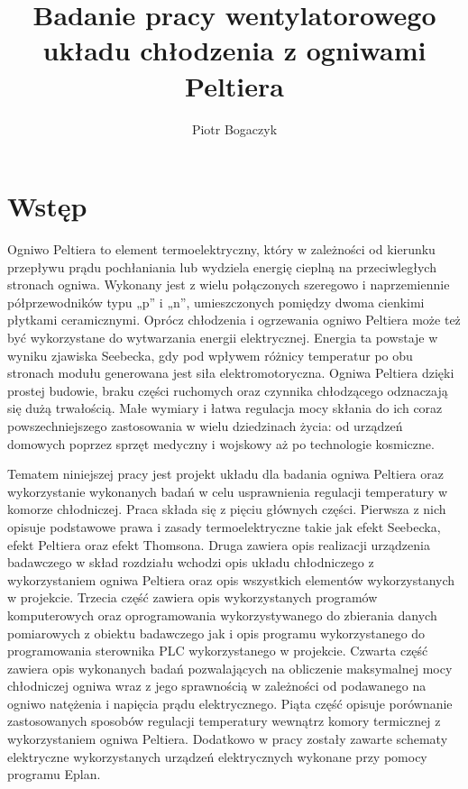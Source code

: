 \documentclass[oneside]{mgr}
\title{Badanie pracy wentylatorowego układu chłodzenia z ogniwami Peltiera}
\author{Piotr Bogaczyk}
\begin{document}
\maketitle
\tableofcontents

\chapter{Wstęp}

Ogniwo Peltiera to element termoelektryczny, który w zależności od kierunku przepływu prądu pochłaniania lub wydziela energię cieplną na przeciwległych stronach ogniwa. Wykonany jest z wielu połączonych szeregowo i naprzemiennie półprzewodników typu „p” i „n”, umieszczonych pomiędzy dwoma cienkimi płytkami ceramicznymi. Oprócz chłodzenia i ogrzewania ogniwo Peltiera może też być wykorzystane do wytwarzania energii elektrycznej. Energia ta powstaje w wyniku zjawiska Seebecka, gdy pod wpływem różnicy temperatur po obu stronach modułu generowana jest siła elektromotoryczna.
Ogniwa Peltiera dzięki prostej budowie, braku części ruchomych oraz czynnika chłodzącego odznaczają się dużą trwałością. Małe wymiary i łatwa regulacja mocy skłania do ich coraz powszechniejszego zastosowania w wielu dziedzinach życia: od urządzeń domowych poprzez sprzęt medyczny i wojskowy aż po technologie kosmiczne.

Tematem niniejszej pracy jest projekt układu dla badania ogniwa Peltiera oraz wykorzystanie wykonanych badań w celu usprawnienia regulacji temperatury w komorze chłodniczej. Praca składa się z pięciu głównych części. Pierwsza z nich opisuje podstawowe prawa i zasady termoelektryczne takie jak efekt Seebecka, efekt Peltiera oraz efekt Thomsona. Druga zawiera opis realizacji urządzenia badawczego w skład rozdziału wchodzi opis układu chłodniczego z wykorzystaniem ogniwa Peltiera oraz opis wszystkich elementów wykorzystanych w projekcie. Trzecia część zawiera opis wykorzystanych programów komputerowych oraz oprogramowania wykorzystywanego do zbierania danych pomiarowych z obiektu badawczego jak i opis programu wykorzystanego do programowania sterownika PLC wykorzystanego w projekcie. Czwarta część zawiera opis wykonanych badań pozwalających na obliczenie maksymalnej mocy chłodniczej ogniwa wraz z jego sprawnością w zależności od podawanego na ogniwo natężenia i napięcia prądu elektrycznego. Piąta część opisuje porównanie zastosowanych sposobów regulacji temperatury wewnątrz komory termicznej z wykorzystaniem ogniwa Peltiera. Dodatkowo w pracy zostały zawarte schematy elektryczne wykorzystanych urządzeń elektrycznych wykonane przy pomocy programu Eplan.
\end{document}
